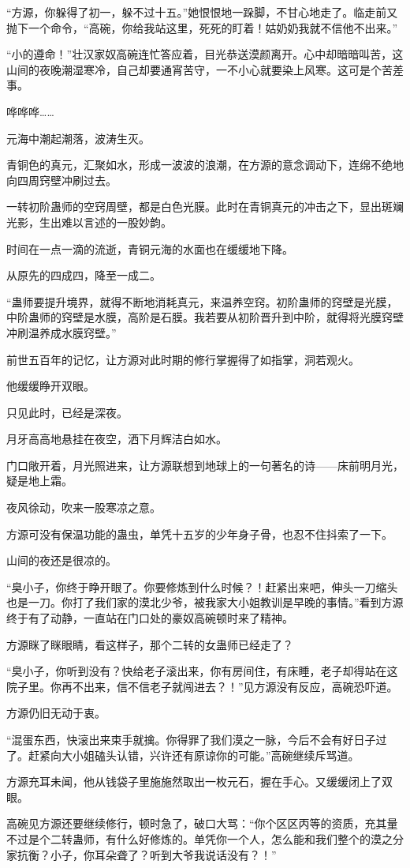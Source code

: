 \begin{this_body}
“方源，你躲得了初一，躲不过十五。”她恨恨地一跺脚，不甘心地走了。临走前又抛下一个命令，“高碗，你给我站这里，死死的盯着！姑奶奶我就不信他不出来。”

“小的遵命！”壮汉家奴高碗连忙答应着，目光恭送漠颜离开。心中却暗暗叫苦，这山间的夜晚潮湿寒冷，自己却要通宵苦守，一不小心就要染上风寒。这可是个苦差事。

哗哗哗……

元海中潮起潮落，波涛生灭。

青铜色的真元，汇聚如水，形成一波波的浪潮，在方源的意念调动下，连绵不绝地向四周窍壁冲刷过去。

一转初阶蛊师的空窍周壁，都是白色光膜。此时在青铜真元的冲击之下，显出斑斓光影，生出难以言述的一股妙韵。

时间在一点一滴的流逝，青铜元海的水面也在缓缓地下降。

从原先的四成四，降至一成二。

“蛊师要提升境界，就得不断地消耗真元，来温养空窍。初阶蛊师的窍壁是光膜，中阶蛊师的窍壁是水膜，高阶是石膜。我若要从初阶晋升到中阶，就得将光膜窍壁冲刷温养成水膜窍壁。”

前世五百年的记忆，让方源对此时期的修行掌握得了如指掌，洞若观火。

他缓缓睁开双眼。

只见此时，已经是深夜。

月牙高高地悬挂在夜空，洒下月辉洁白如水。

门口敞开着，月光照进来，让方源联想到地球上的一句著名的诗——床前明月光，疑是地上霜。

夜风徐动，吹来一股寒凉之意。

方源可没有保温功能的蛊虫，单凭十五岁的少年身子骨，也忍不住抖索了一下。

山间的夜还是很凉的。

“臭小子，你终于睁开眼了。你要修炼到什么时候？！赶紧出来吧，伸头一刀缩头也是一刀。你打了我们家的漠北少爷，被我家大小姐教训是早晚的事情。”看到方源终于有了动静，一直站在门口处的豪奴高碗顿时来了精神。

方源眯了眯眼睛，看这样子，那个二转的女蛊师已经走了？

“臭小子，你听到没有？快给老子滚出来，你有房间住，有床睡，老子却得站在这院子里。你再不出来，信不信老子就闯进去？！”见方源没有反应，高碗恐吓道。

方源仍旧无动于衷。

“混蛋东西，快滚出来束手就擒。你得罪了我们漠之一脉，今后不会有好日子过了。赶紧向大小姐磕头认错，兴许还有原谅你的可能。”高碗继续斥骂道。

方源充耳未闻，他从钱袋子里施施然取出一枚元石，握在手心。又缓缓闭上了双眼。

高碗见方源还要继续修行，顿时急了，破口大骂：“你个区区丙等的资质，充其量不过是个二转蛊师，有什么好修炼的。单凭你一个人，怎么能和我们整个的漠之分家抗衡？小子，你耳朵聋了？听到大爷我说话没有？！”

\end{this_body}

